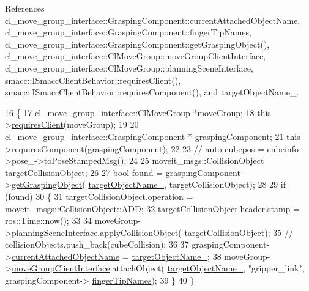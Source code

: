 References cl\+\_\+move\+\_\+group\+\_\+interface\+::\+Grasping\+Component\+::current\+Attached\+Object\+Name, cl\+\_\+move\+\_\+group\+\_\+interface\+::\+Grasping\+Component\+::finger\+Tip\+Names, cl\+\_\+move\+\_\+group\+\_\+interface\+::\+Grasping\+Component\+::get\+Grasping\+Object(), cl\+\_\+move\+\_\+group\+\_\+interface\+::\+Cl\+Move\+Group\+::move\+Group\+Client\+Interface, cl\+\_\+move\+\_\+group\+\_\+interface\+::\+Cl\+Move\+Group\+::planning\+Scene\+Interface, smacc\+::\+I\+Smacc\+Client\+Behavior\+::requires\+Client(), smacc\+::\+I\+Smacc\+Client\+Behavior\+::requires\+Component(), and target\+Object\+Name\+\_\+.


\begin{DoxyCode}
16     \{
17         \hyperlink{classcl__move__group__interface_1_1ClMoveGroup}{cl\_move\_group\_interface::ClMoveGroup} *moveGroup;
18         this->\hyperlink{classsmacc_1_1ISmaccClientBehavior_a32b16e99e3b4cb289414203dc861a440}{requiresClient}(moveGroup);
19 
20         \hyperlink{classcl__move__group__interface_1_1GraspingComponent}{cl\_move\_group\_interface::GraspingComponent} *
      graspingComponent;
21         this->\hyperlink{classsmacc_1_1ISmaccClientBehavior_a19c6d658c8e809bb93bfdc9b639a3ac3}{requiresComponent}(graspingComponent);
22 
23         \textcolor{comment}{// auto cubepos = cubeinfo->pose\_->toPoseStampedMsg();}
24 
25         moveit\_msgs::CollisionObject targetCollisionObject;
26 
27         \textcolor{keywordtype}{bool} found = graspingComponent->\hyperlink{classcl__move__group__interface_1_1GraspingComponent_a283b379a7b7ad91c69ee94a057730165}{getGraspingObject}(
      \hyperlink{classcl__move__group__interface_1_1CbAttachObject_a58dcc567e6316e57eb36e6d5a38f7287}{targetObjectName\_}, targetCollisionObject);
28 
29         \textcolor{keywordflow}{if} (found)
30         \{
31             targetCollisionObject.operation = moveit\_msgs::CollisionObject::ADD;
32             targetCollisionObject.header.stamp = ros::Time::now();
33 
34             moveGroup->\hyperlink{classcl__move__group__interface_1_1ClMoveGroup_a11bfab580f36e2ad32c9b37d6f58f44c}{planningSceneInterface}.applyCollisionObject(
      targetCollisionObject);
35             \textcolor{comment}{// collisionObjects.push\_back(cubeCollision);}
36 
37             graspingComponent->\hyperlink{classcl__move__group__interface_1_1GraspingComponent_a486b5c831dc81ae0bf909b585ba7c615}{currentAttachedObjectName} = 
      \hyperlink{classcl__move__group__interface_1_1CbAttachObject_a58dcc567e6316e57eb36e6d5a38f7287}{targetObjectName\_};
38             moveGroup->\hyperlink{classcl__move__group__interface_1_1ClMoveGroup_a92922ea689e4e1b7b91512c56629c95b}{moveGroupClientInterface}.attachObject(
      \hyperlink{classcl__move__group__interface_1_1CbAttachObject_a58dcc567e6316e57eb36e6d5a38f7287}{targetObjectName\_}, \textcolor{stringliteral}{"gripper\_link"}, graspingComponent->
      \hyperlink{classcl__move__group__interface_1_1GraspingComponent_afc08a0abc3220a377d0bbf798383a42a}{fingerTipNames});
39         \}
40     \}
\end{DoxyCode}
